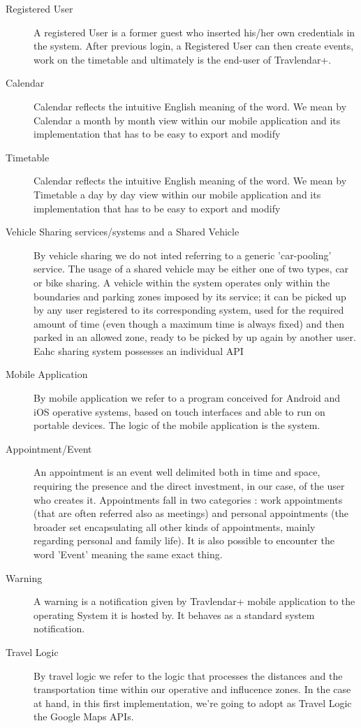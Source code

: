 \begin{description}
				\item[Registered User] A registered User is a former guest who inserted his/her own credentials in the system. After previous login, a Registered User can then create events, work on the timetable and ultimately is the end-user of Travlendar+.
				\item[Calendar] Calendar reflects the intuitive English meaning of the word. We mean by Calendar a month by month view within our mobile application and its implementation that has to be easy to export and modify
			       	\item[Timetable] Calendar reflects the intuitive English meaning of the word. We mean by Timetable a day by day view within our mobile application and its implementation that has to be easy to export and modify
				\item[Vehicle Sharing services/systems and a Shared Vehicle] By vehicle sharing we do not inted referring to a generic 'car-pooling' service. The usage of a shared vehicle may be either one of two types, car or bike sharing. A vehicle within the system operates only within the boundaries and parking zones imposed by its service; it can be picked up by any user registered to its corresponding system, used for the required amount of time (even though a maximum time is always fixed) and then parked in an allowed zone, ready to be picked by up again by another user. Eahc sharing system possesses an individual API			
				\item[Mobile Application] By mobile application we refer to a program conceived for Android and iOS operative systems, based on touch interfaces and able to run on portable devices. The logic of the mobile application is the system.
				\item[Appointment/Event] An appointment is an event well delimited both in time and space, requiring the presence and the direct investment, in our case, of the user who creates it. Appointments fall in two categories : work appointments (that are often referred also as meetings) and personal appointments (the broader set encapsulating all other kinds of appointments, mainly regarding personal and family life). It is also possible to encounter the word 'Event' meaning the same exact thing.
				\item[Warning] A warning is a notification given by Travlendar+ mobile application to the operating System it is hosted by. It behaves as a standard system notification.
				\item[Travel Logic] By travel logic we refer to the logic that processes the distances and the transportation time within our operative and influcence zones. In the case at hand, in this first implementation, we're going to adopt as Travel Logic the Google Maps APIs.

\end{description}
